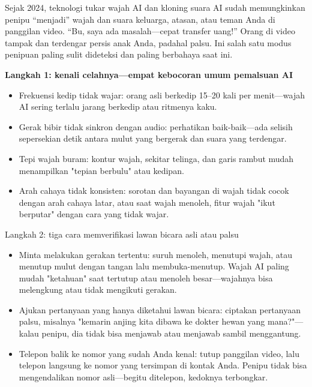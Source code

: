 
Sejak 2024, teknologi tukar wajah AI dan kloning suara AI sudah memungkinkan penipu “menjadi” wajah dan suara keluarga, atasan, atau teman Anda di panggilan video. “Bu, saya ada masalah—cepat transfer uang!” Orang di video tampak dan terdengar persis anak Anda, padahal palsu. Ini salah satu modus penipuan paling sulit dideteksi dan paling berbahaya saat ini.

\textbf{Langkah 1: kenali celahnya—empat kebocoran umum pemalsuan AI}\par

\begin{itemize}
  \item Frekuensi kedip tidak wajar: orang asli berkedip 15–20 kali per menit—wajah AI sering terlalu jarang berkedip atau ritmenya kaku.
  \item Gerak bibir tidak sinkron dengan audio: perhatikan baik-baik—ada selisih sepersekian detik antara mulut yang bergerak dan suara yang terdengar.
  \item Tepi wajah buram: kontur wajah, sekitar telinga, dan garis rambut mudah menampilkan "tepian berbulu" atau kedipan.
  \item Arah cahaya tidak konsisten: sorotan dan bayangan di wajah tidak cocok dengan arah cahaya latar, atau saat wajah menoleh, fitur wajah "ikut berputar" dengan cara yang tidak wajar.
\end{itemize}

\begin{tcbinfo}{Langkah 2: tiga cara memverifikasi lawan bicara asli atau palsu}
\begin{itemize}
  \item Minta melakukan gerakan tertentu: suruh menoleh, menutupi wajah, atau menutup mulut dengan tangan lalu membuka-menutup. Wajah AI paling mudah "ketahuan" saat tertutup atau menoleh besar—wajahnya bisa melengkung atau tidak mengikuti gerakan.
  \item Ajukan pertanyaan yang hanya diketahui lawan bicara: ciptakan pertanyaan palsu, misalnya "kemarin anjing kita dibawa ke dokter hewan yang mana?"—kalau penipu, dia tidak bisa menjawab atau menjawab sambil menggantung.
  \item Telepon balik ke nomor yang sudah Anda kenal: tutup panggilan video, lalu telepon langsung ke nomor yang tersimpan di kontak Anda. Penipu tidak bisa mengendalikan nomor asli—begitu ditelepon, kedoknya terbongkar.
\end{itemize}

\end{tcbinfo}

